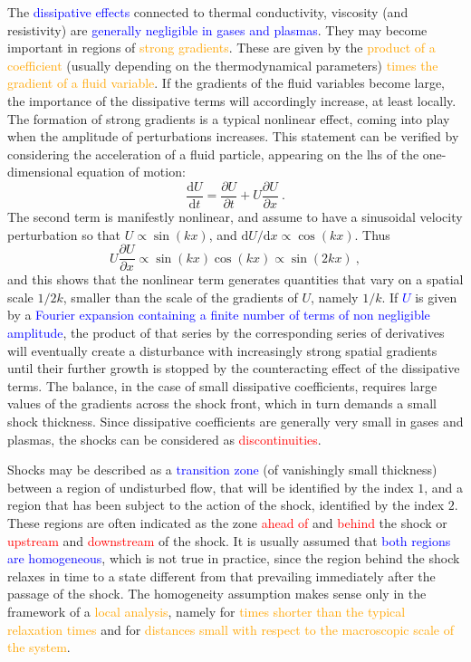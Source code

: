 \documentclass[12pt,a4paper]{article}
\newcommand{\dif}{\mathrm{d}}
\begin{document}
The \textcolor{blue}{dissipative effects} connected to thermal conductivity, viscosity (and resistivity) are \textcolor{blue}{generally negligible in gases and plasmas}. They may become important in regions of \textcolor{orange}{strong gradients}. These are given by the \textcolor{orange}{product of a coefficient} (usually depending on the thermodynamical parameters) \textcolor{orange}{times the gradient of a fluid variable}. If the gradients of the fluid variables become large, the importance of the dissipative terms will accordingly increase, at least locally. The formation of strong gradients is a typical nonlinear effect, coming into play when the amplitude of perturbations increases. This statement can be verified by considering the acceleration of a fluid particle, appearing on the lhs of the one-dimensional equation of motion:
\begin{equation}
\dfrac{\dif U}{\dif t} = \dfrac{\partial U}{\partial t} +U\dfrac{\partial U}{\partial x} ~. 
\end{equation}
The second term is manifestly nonlinear, and assume to have a sinusoidal velocity perturbation so that $U \propto \sin(kx)$, and $\dif U/\dif x \propto \cos(kx)$. Thus
\begin{equation}
U\dfrac{\partial U}{\partial x} \propto \sin(kx) \cos(kx) \propto \sin(2kx) ~,
\end{equation}
and this shows that the nonlinear term generates quantities that vary on a spatial scale $1/2k$, smaller than the scale of the gradients of $U$, namely $1/k$. If \textcolor{blue}{$U$} is given by a \textcolor{blue}{Fourier expansion containing a finite number of terms of non negligible amplitude}, the product of that series by the corresponding series of derivatives will eventually create a disturbance with increasingly strong spatial gradients until their further growth is stopped by the counteracting effect of the dissipative terms. The balance, in the case of small dissipative coefficients, requires large values of the gradients across the shock front, which in turn demands a small shock thickness. Since dissipative coefficients are generally very small in gases and plasmas, the shocks can be considered as \textcolor{red}{discontinuities}.


Shocks may be described as a \textcolor{blue}{transition zone} (of vanishingly small thickness) between a region of undisturbed flow, that will be identified by the index $1$, and a region that has been subject to the action of the shock, identified by the index $2$. These regions are often indicated as the zone \textcolor{red}{ahead of} and \textcolor{red}{behind} the shock or \textcolor{red}{upstream} and \textcolor{red}{downstream} of the shock. It is usually assumed that \textcolor{blue}{both regions are homogeneous}, which is not true in practice, since the region behind the shock relaxes in time to a state different from that prevailing immediately after the passage of the shock. The homogeneity assumption makes sense only in the framework of a \textcolor{orange}{local analysis}, namely for \textcolor{orange}{times shorter than the typical relaxation times} and for \textcolor{orange}{distances small with respect to the macroscopic scale of the system}.
\end{document}
